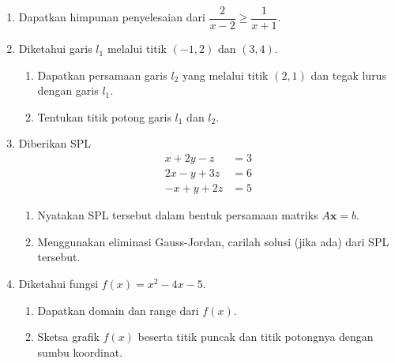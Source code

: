 \documentclass[10pt,openany,a4paper]{article}
\theoremstyle{definition}
\theoremstyle{definition}
\theoremstyle{plain}
\begin{document}
\begin{enumerate}
    \item Dapatkan himpunan penyelesaian dari $\dfrac{2}{x-2}\geq\dfrac{1}{x+1}$.

    \item Diketahui garis $l_1$ melalui titik $(-1,2)$ dan $(3,4)$.
    \begin{enumerate}
        \item Dapatkan persamaan garis $l_2$ yang melalui titik $(2,1)$ dan tegak lurus dengan garis $l_1$.
        \item Tentukan titik potong garis $l_1$ dan $l_2$.
    \end{enumerate}

    \item Diberikan SPL
    \begin{align*}
        x+2y-z &= 3\\
        2x-y+3z &= 6\\
        -x+y+2z &= 5
    \end{align*}
    \begin{enumerate}
        \item Nyatakan SPL tersebut dalam bentuk persamaan matriks $A\mathbf{x}=b$.
        \item Menggunakan eliminasi Gauss-Jordan, carilah solusi (jika ada) dari SPL tersebut.
    \end{enumerate}

    \item Diketahui fungsi $f(x)=x^2-4x-5$.
    \begin{enumerate}
        \item Dapatkan domain dan range dari $f(x)$.
        \item Sketsa grafik $f(x)$ beserta titik puncak dan titik potongnya dengan sumbu koordinat.
    \end{enumerate}


\end{enumerate}
\end{document}
